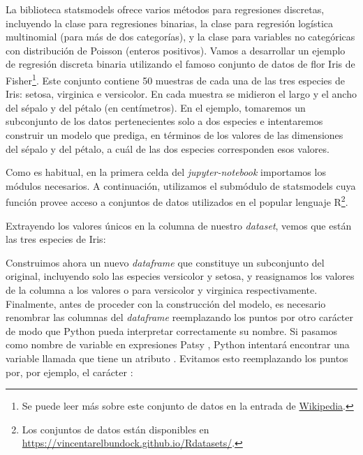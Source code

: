  La biblioteca statsmodels ofrece varios métodos para regresiones discretas, incluyendo la clase  para regresiones binarias, la clase para regresión logística multinomial  (para más de dos categorías), y la clase  para variables no categóricas con distribución de Poisson (enteros positivos). Vamos a desarrollar un ejemplo de regresión discreta binaria utilizando el famoso conjunto de datos de flor Iris de Fisher\footnote{Se puede leer más sobre este conjunto de datos en la entrada de \href{https://es.wikipedia.org/wiki/Conjunto_de_datos_flor_iris}{Wikipedia}.}. Este conjunto contiene 50 muestras de cada una de las tres especies de Iris: setosa, virginica e versicolor. En cada muestra se midieron el largo y el ancho del sépalo y del pétalo (en centímetros). En el ejemplo, tomaremos un subconjunto de los datos pertenecientes solo a dos especies e intentaremos construir un modelo que prediga, en términos de los valores de las dimensiones del sépalo y del pétalo, a cuál de las dos especies corresponden esos valores.
 
 Como es habitual, en la primera celda del \textit{jupyter-notebook} importamos los módulos necesarios. A continuación, utilizamos el submódulo  de statsmodels cuya función  provee acceso a conjuntos de datos utilizados en el popular lenguaje R\footnote{Los conjuntos de datos están disponibles en \url{https://vincentarelbundock.github.io/Rdatasets/}.}. 
 
 
 Extrayendo los valores únicos en la columna  de nuestro \textit{dataset}, vemos que están las tres especies de Iris:
 
 
 Construimos ahora un nuevo \textit{dataframe} que constituye un subconjunto del original, incluyendo solo las especies versicolor y setosa, y reasignamos los valores de la columna  a los valores  o  para versicolor y virginica respectivamente. Finalmente, antes de proceder con la construcción del modelo, es necesario renombrar las columnas del \textit{dataframe} reemplazando los puntos por otro carácter de modo que Python pueda interpretar correctamente su nombre. Si pasamos como nombre de variable en expresiones Patsy , Python intentará encontrar una variable llamada  que tiene un atributo . Evitamos esto reemplazando los puntos por, por ejemplo, el carácter :
 
